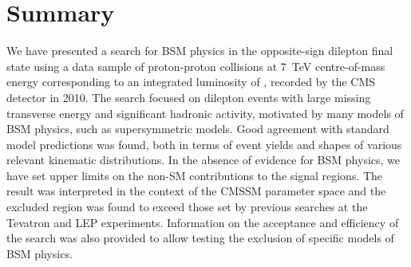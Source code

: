 \section{Summary}
\label{sec:conclusion}

We have presented a search for BSM physics in the opposite-sign dilepton final state using 
a data sample of proton-proton collisions at 7~TeV centre-of-mass energy corresponding to an integrated
luminosity of \lumifinal, recorded by the CMS detector in 2010.
The search focused on dilepton events with large missing transverse energy and significant hadronic activity,
motivated by many models of BSM physics, such as supersymmetric models.
Good agreement with standard model predictions was found, both in terms of event yields and shapes of 
various relevant kinematic distributions. In the absence of evidence for BSM physics, 
we have set upper limits on the non-SM contributions to the signal regions. The result was interpreted
in the context of the CMSSM parameter space and the excluded region was found to exceed those set by
previous searches at the Tevatron and LEP experiments. 
Information on the acceptance and efficiency of the search was also provided to 
allow testing the exclusion of specific models of BSM physics.
